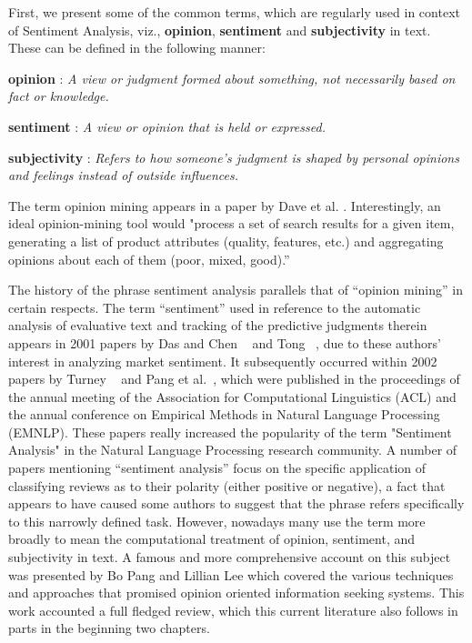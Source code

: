 First, we present some of the common terms, which are regularly used in context of Sentiment Analysis, viz., \textbf{opinion}, \textbf{sentiment} and \textbf{subjectivity} in text. These can be defined in the following manner:
\newline

\textbf{opinion} : \textit{A view or judgment formed about something, not necessarily based on fact or knowledge.}
\newline

\textbf{sentiment} : \textit{A view or opinion that is held or expressed.}
\newline

\textbf{subjectivity} : \textit{Refers to how someone's judgment is shaped by personal opinions and feelings instead of outside influences. }
\newline

The term opinion mining appears in a paper by Dave et al. \parencite{ch1:dave}. Interestingly, an ideal opinion-mining tool would "process a set of search results for a given item, generating a list of product attributes (quality, features, etc.) and aggregating opinions about each of them (poor, mixed, good).” 
\newline

The history of the phrase sentiment analysis parallels that of “opinion mining” in certain respects. The term “sentiment” used in reference to the automatic analysis of evaluative text and tracking of the predictive judgments therein appears in 2001 papers by Das and Chen ~\parencite{ch1:daschen} and Tong ~\parencite{ch1:tong}, due to these authors’ interest in analyzing market sentiment. It subsequently occurred within 2002 papers by Turney ~\parencite{ch1:turney} and Pang et al.~\parencite{ch1:pang}, which were published in the proceedings of the annual meeting of the Association for Computational Linguistics (ACL) and the annual conference on Empirical Methods in Natural Language Processing (EMNLP). These papers really increased the popularity of the term "Sentiment Analysis" in the Natural Language Processing research community. A number of papers mentioning “sentiment analysis” focus on the specific application of classifying reviews as to their polarity (either positive or negative), a fact that appears to have caused some authors to suggest that the phrase refers specifically to this narrowly defined task. However, nowadays many use the term more broadly to mean the computational treatment of opinion, sentiment, and subjectivity in text. A famous and more comprehensive account on this subject was presented by Bo Pang and Lillian Lee\parencite{pangleesentiment} \parencite{ch1:pang} which covered the various techniques and approaches that promised opinion oriented information seeking systems. This work accounted a full fledged review, which this current literature also follows in parts in the beginning two chapters.
\newline


